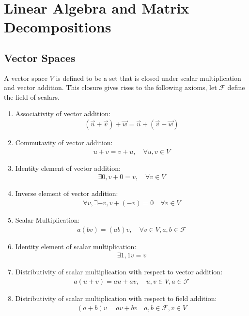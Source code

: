 \chapter{Linear Algebra and Matrix Decompositions}
\section{Vector Spaces}
\begin{ddef}
	A vector space $V$ is defined to be a set that is closed under scalar multiplication and vector addition. This closure gives rises to the following axioms, let $\mathcal{F}$ define the field of scalars.
\begin{enumerate}
\item Associativity of vector addition:
	\begin{align*}
	(\vec{u} + \vec{v}) + \vec{w} = \vec{u} + (\vec{v} + \vec{w})
	\end{align*}
\item Commutavity of vector addition:
	\begin{align*}
		u + v = v + u, \quad \forall u, v \in V
	\end{align*}
\item Identity element of vector addition:
	\begin{align*}
		\exists 0, v + 0 = v, \quad \forall v \in V
	\end{align*}
\item Inverse element of vector addition:
	\begin{align*}
		\forall v, \exists -v, v+ (-v) = 0  \quad \forall v \in V
	\end{align*}
\item Scalar Multiplication:
	\begin{align*}
	a(bv) = (ab)v, \quad \forall v \in V, a,b \in \mathcal{F}
        \end{align*}

\item Identity element of scalar multiplication:
	\begin{align*}
		\exists 1, 1v = v
	\end{align*}
\item Distributivity of scalar multiplication with respect to vector addition:
	\begin{align*}
		a(u + v) = au + av, \quad u,v \in V, a \in \mathcal{F}
	\end{align*}
\item Distributivity of scalar multiplication with respect to field addition:
	\begin{align*}
		(a+b)v = av + bv \quad a,b \in \mathcal{F}, v \in V
	\end{align*}
\end{enumerate}
\end{ddef}

